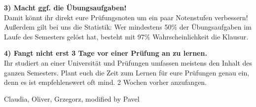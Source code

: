 \textbf{3) Macht ggf. die Übungsaufgaben!}\\
Damit könnt ihr direkt eure Prüfungsnoten um ein paar Notenstufen verbessern! Außerdem gilt bei uns die Statistik: Wer mindestens 50\% der Übungsaufgaben im Laufe des Semesters gelöst hat, besteht mit 97\% Wahrscheinlichkeit die Klausur.

\textbf{4) Fangt nicht erst 3 Tage vor einer Prüfung an zu lernen.}\\
Ihr studiert an einer Universität und Prüfungen umfassen meistens den Inhalt des ganzen Semesters. Plant euch die Zeit zum Lernen für eure Prüfungen genau ein, denn es ist empfehlenswert oft mind. 2 Wochen vorher anzufangen.\\

\begin{flushright}Claudia, Oliver, Grzegorz, modified by Pavel \end{flushright}

